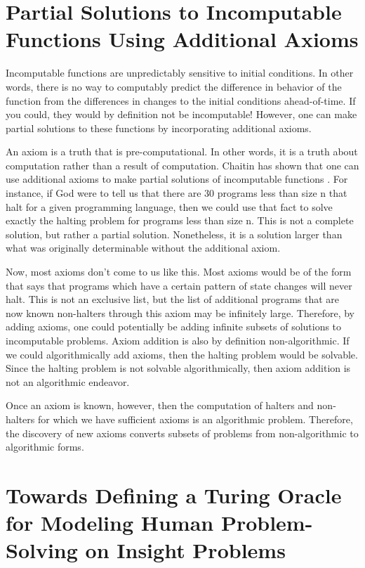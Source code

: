 \section[Partial Solutions to Incomputable Functions]{Partial Solutions to Incomputable Functions Using Additional Axioms}

Incomputable functions are unpredictably sensitive to initial conditions.  In other words, there is no way to computably predict the difference in behavior of the function from the differences in changes to the initial conditions ahead-of-time.  If you could, they would by definition not be incomputable!  However, one can make partial solutions to these functions by incorporating additional axioms.

An axiom is a truth that is pre-computational.  In other words, it is a truth about computation rather than a result of computation.  Chaitin has shown that one can use additional axioms to make partial solutions of incomputable functions \citep{chaitin1982}.  For instance, if God were to tell us that there are 30 programs less than size n that halt for a given programming language, then we could use that fact to solve exactly the halting problem for programs less than size n.  This is not a complete solution, but rather a partial solution.  Nonetheless, it is a solution larger than what was originally determinable without the additional axiom.

Now, most axioms don't come to us like this.  Most axioms would be of the form that says that programs which have a certain pattern of state changes will never halt.  This is not an exclusive list, but the list of additional programs that are now known non-halters through this axiom may be infinitely large.  Therefore, by adding axioms, one could potentially be adding infinite subsets of solutions to incomputable problems.  Axiom addition is also by definition non-algorithmic.  If we could algorithmically add axioms, then the halting problem would be solvable.  Since the halting problem is not solvable algorithmically, then axiom addition is not an algorithmic endeavor.

Once an axiom is known, however, then the computation of halters and non-halters for which we have sufficient axioms is an algorithmic problem.  Therefore, the discovery of new axioms converts subsets of problems from non-algorithmic to algorithmic forms.

\section[Towards Defining a Turing Oracle]{Towards Defining a Turing Oracle for Modeling Human Problem-Solving on Insight Problems}

